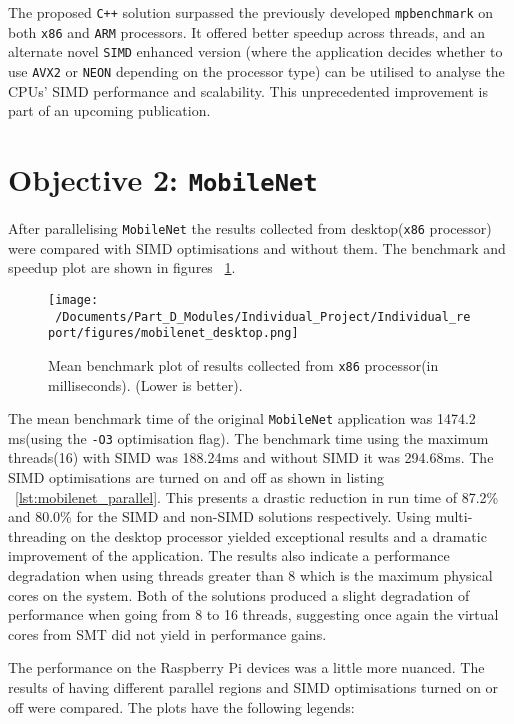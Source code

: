 The proposed \texttt{C++} solution surpassed the previously developed \texttt{mpbenchmark}\cite{mpbenchmark_paper} on both \texttt{x86} and \texttt{ARM} processors. It offered better speedup across threads, and an alternate novel \texttt{SIMD} enhanced version (where the application decides whether to use \texttt{AVX2} or \texttt{NEON} depending on the processor type) can be utilised to analyse the CPUs' SIMD performance and scalability. This unprecedented improvement is part of an upcoming publication.

\section{Objective 2: \texttt{MobileNet}}
After parallelising \texttt{MobileNet} the results collected from desktop(\texttt{x86} processor) were compared with SIMD optimisations and without them. The benchmark and speedup plot are shown in figures ~\ref{fig:mobilenet_desktop_plot}.

\begin{figure}[htbp] %
	\centering
	\texttt{[image: ~/Documents/Part\_D\_Modules/Individual\_Project/Individual\_report/figures/mobilenet\_desktop.png]} %
	\caption{Mean benchmark plot of results collected from \texttt{x86} processor(in milliseconds). (Lower is better).}
	\label{fig:mobilenet_desktop_plot} %
\end{figure}

The mean benchmark time of the original \texttt{MobileNet} application\cite{mobilenet_repo} was 1474.2 ms(using the \texttt{-O3} optimisation flag). The benchmark time using the maximum threads(16) with SIMD was 188.24ms and without SIMD it was 294.68ms. The SIMD optimisations are turned on and off as shown in listing  ~\ref{lst:mobilenet_parallel}. This presents a drastic reduction in run time of 87.2\% and 80.0\% for the SIMD and non-SIMD solutions respectively. Using multi-threading on the desktop processor yielded exceptional results and a dramatic improvement of the application. The results also indicate a performance degradation when using threads greater than 8 which is the maximum physical cores on the system. Both of the solutions produced a slight degradation of performance when going from 8 to 16 threads, suggesting once again the virtual cores from SMT did not yield in performance gains. 

The performance on the Raspberry Pi devices was a little more nuanced. The results of having different parallel regions and SIMD optimisations turned on or off were compared. The plots have the following legends:

